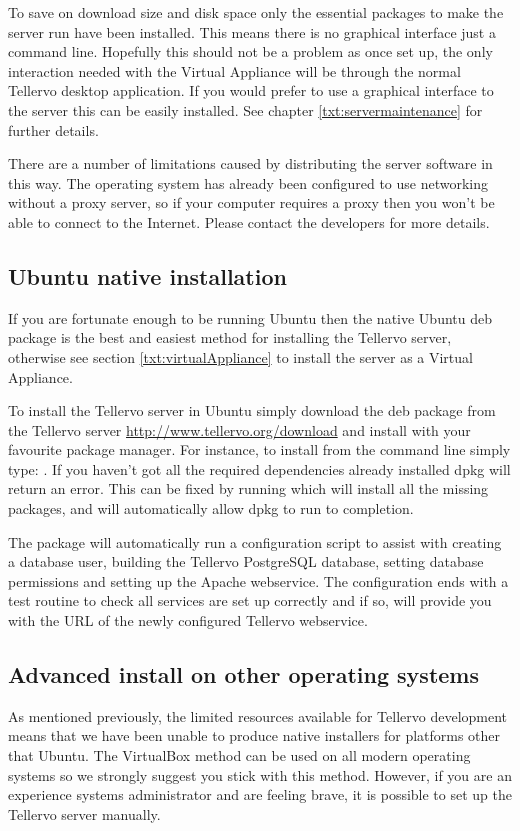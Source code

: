 To save on download size and disk space only the essential packages to make the server run have been installed.  This means there is no graphical interface just a command line.  Hopefully this should not be a problem as once set up, the only interaction needed with the Virtual Appliance will be through the normal Tellervo desktop application.  If you would prefer to use a graphical interface to the server this can be easily installed.  See chapter \ref{txt:servermaintenance} for further details.

There are a number of limitations caused by distributing the server software in this way. The operating system has already been configured to use networking without a proxy server, so if your computer requires a proxy then you won't be able to connect to the Internet.  Please contact the developers for more details.

\subsection{Ubuntu native installation}
\label{txt:installnativeserver}
If you are fortunate enough to be running Ubuntu then the native Ubuntu deb package is the best and easiest method for installing the Tellervo server, otherwise see section \ref{txt:virtualAppliance} to install the server as a Virtual Appliance.  

To install the Tellervo server in Ubuntu simply download the deb package from the Tellervo server \url{http://www.tellervo.org/download} and install with your favourite package manager.  For instance, to install from the command line simply type: .  If you haven't got all the required dependencies already installed dpkg will return an error.  This can be fixed by running  which will install all the missing packages, and will automatically allow dpkg to run to completion.  

The package will automatically run a configuration script to assist with creating a database user, building the Tellervo PostgreSQL database, setting database permissions and setting up the Apache webservice.  The configuration ends with a test routine to check all services are set up correctly and if so, will provide you with the URL of the newly configured Tellervo webservice.

\subsection{Advanced install on other operating systems}
\label{txt:installadvancedserver}
As mentioned previously, the limited resources available for Tellervo development means that we have been unable to produce native installers for platforms other that Ubuntu.  The VirtualBox method can be used on all modern operating systems so we strongly suggest you stick with this method.  However, if you are an experience systems administrator and are feeling brave, it is possible to set up the Tellervo server manually.  


